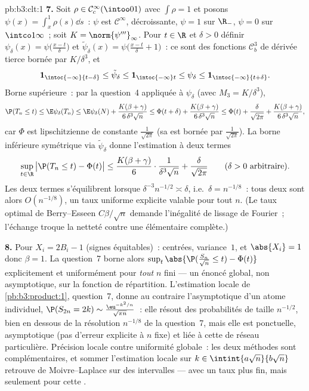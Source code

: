 \begin{solution}{pb:b3:clt:1}
\textbf{7.} Soit $\rho \in \mathcal C^\infty_c(\intoo01)$
avec $\int\rho = 1$ et posons $\psi(x) =
\int_x^1\rho(s)\dd s$~: $\psi$ est $\mathcal C^\infty$,
décroissante, $\psi = 1$ sur $\R_-$, $\psi = 0$ sur
$\intco1\infty$~; soit $K = \norm{\psi'''}_\infty$. Pour
$t \in \R$ et $\delta > 0$ définir $\psi_\delta(x) =
\psi\bigl(\frac{x - t}\delta\bigr)$ et
$\tilde\psi_\delta(x) = \psi\bigl(\frac{x - t}\delta +
1\bigr)$~: ce sont des fonctions $\mathcal C^3_b$ de dérivée
tierce bornée par $K/\delta^3$, et
\[
\mathbf 1_{\intoc{-\infty}{t-\delta}} \leq
\tilde\psi_\delta \leq \mathbf 1_{\intoc{-\infty}t} \leq
\psi_\delta \leq \mathbf 1_{\intoc{-\infty}{t+\delta}} .
\]
Borne supérieure~: par la question~4 appliquée à
$\psi_\delta$ (avec $M_3 = K/\delta^3$),
\[
\P(T_n \leq t) \leq \E\psi_\delta(T_n) \leq
\E\psi_\delta(N) + \frac{K(\beta +
\gamma)}{6\,\delta^3\sqrt n}
\leq \Phi(t + \delta) + \frac{K(\beta +
\gamma)}{6\,\delta^3\sqrt n}
\leq \Phi(t) + \frac{\delta}{\sqrt{2\pi}} +
\frac{K(\beta + \gamma)}{6\,\delta^3\sqrt n},
\]
car $\Phi$ est lipschitzienne de constante
$\frac1{\sqrt{2\pi}}$ (sa  est bornée par
$\frac1{\sqrt{2\pi}}$). La borne inférieure symétrique via
$\tilde\psi_\delta$ donne l'estimation à deux termes
\[
\sup_{t\in\R}\,\bigl|\P(T_n \leq t) - \Phi(t)\bigr| \leq
\frac{K(\beta + \gamma)}{6}\cdot\frac{1}{\delta^3\sqrt n} +
\frac{\delta}{\sqrt{2\pi}}
\qquad(\delta > 0\ \text{arbitraire}).
\]
Les deux termes s'équilibrent lorsque $\delta^{-3}n^{-1/2}
\asymp \delta$, i.e.\ $\delta = n^{-1/8}$~: tous deux sont
alors $O(n^{-1/8})$, un taux uniforme explicite valable pour
tout $n$. (Le taux optimal de Berry--Esseen $C\beta/\sqrt n$
demande l'inégalité de lissage de Fourier~; l'échange troque
la netteté contre une élémentaire complète.)

\textbf{8.} Pour $X_i = 2B_i - 1$ (signes équitables)~:
centrées, variance~$1$, et $\abs{X_i} = 1$ donc $\beta = 1$.
La question~7 borne alors $\sup_t\abs{\P(\frac{S_n}{\sqrt n}
\leq t) - \Phi(t)}$ explicitement et uniformément pour
\emph{tout} $n$ fini --- un énoncé global, non asymptotique,
sur la fonction de répartition. L'estimation locale de
\cref{pb:b3:product:1}, question~7, donne au contraire
l'asymptotique  d'un atome individuel, $\P(S_{2n} =
2k) \sim \frac{\eu^{-k^2/n}}{\sqrt{\pi n}}$~: elle résout
des probabilités de taille $n^{-1/2}$, bien en dessous de la
résolution $n^{-1/8}$ de la question~7, mais elle est
ponctuelle, asymptotique (pas d'erreur explicite à $n$ fixe)
et liée à cette  de réseau particulière. Précision locale
contre uniformité globale~: les deux méthodes sont
complémentaires, et sommer l'estimation locale sur $k \in
\intint{a\sqrt n}{b\sqrt n}$ retrouve de Moivre--Laplace sur
des intervalles --- avec un taux plus fin, mais seulement
pour cette .


\end{solution}
